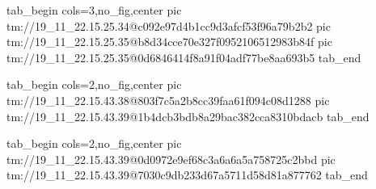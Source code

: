  
 
 
 
 

\qqSecOrig


\ifcmt
  tab_begin cols=3,no_fig,center
    pic tm://19_11_22.15.25.34@c092e97d4b1cc9d3afcf53f96a79b2b2
    pic tm://19_11_22.15.25.35@b8d34cce70e327f0952106512983b84f
    pic tm://19_11_22.15.25.35@0d6846414f8a91f04adf77be8aa693b5
  tab_end
\fi


\ifcmt
  tab_begin cols=2,no_fig,center
    pic tm://19_11_22.15.43.38@803f7c5a2b8cc39faa61f094c08d1288
    pic tm://19_11_22.15.43.39@1b4dcb3bdb8a29bac382cca8310bdacb
  tab_end
\fi


\ifcmt
  tab_begin cols=2,no_fig,center
    pic tm://19_11_22.15.43.39@0d0972e9ef68c3a6a6a5a758725c2bbd
    pic tm://19_11_22.15.43.39@7030c9db233d67a5711d58d81a877762
  tab_end
\fi

